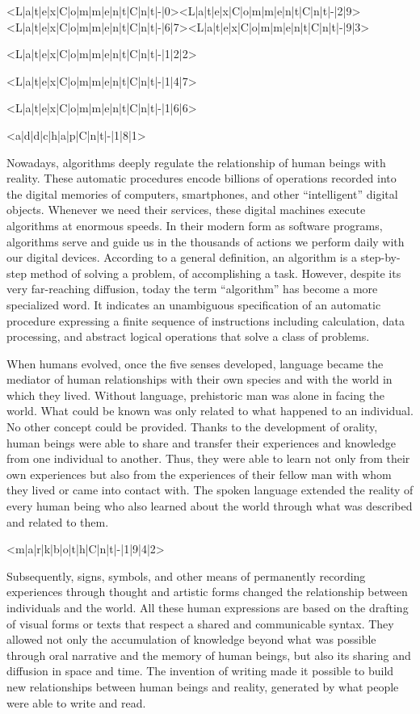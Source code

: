 <L|a|t|e|x|C|o|m|m|e|n|t|C|n|t|-|0><L|a|t|e|x|C|o|m|m|e|n|t|C|n|t|-|2|9><L|a|t|e|x|C|o|m|m|e|n|t|C|n|t|-|6|7><L|a|t|e|x|C|o|m|m|e|n|t|C|n|t|-|9|3>

<L|a|t|e|x|C|o|m|m|e|n|t|C|n|t|-|1|2|2>

<L|a|t|e|x|C|o|m|m|e|n|t|C|n|t|-|1|4|7>

<L|a|t|e|x|C|o|m|m|e|n|t|C|n|t|-|1|6|6>

<a|d|d|c|h|a|p|C|n|t|-|1|8|1>

Nowadays, algorithms deeply regulate the relationship of human beings with reality. These automatic procedures encode billions of operations recorded into the digital memories of computers, smartphones, and other ``intelligent'' digital objects. Whenever we need their services, these digital machines execute \hbox{algorithms} at enormous speeds. In their modern form as software programs, algorithms serve and guide us in the thousands of actions we perform daily with our digital devices. According to a general definition, an algorithm is a step-by-step method of solving a problem, of accomplishing a task. However, despite its very far-reaching diffusion, today the term ``algorithm'' has become a more specialized word. It indicates an unambiguous specification of an automatic procedure expressing a finite sequence of instructions including calculation, data processing, and abstract logical operations that solve a class of problems.

When humans evolved, once the five senses developed, language became the mediator of human relationships with their own species and with the world in which they lived. Without language, prehistoric man was alone in facing the world. What could be known was only related to what happened to an individual. No other concept could be provided. Thanks to the development of orality, human beings were able to share and transfer their experiences and knowledge from one individual to another. Thus, they were able to learn not only from their own experiences but also from the experiences of their fellow man with whom they lived or came into contact with. The spoken language extended the reality of every human being who also learned about the world through what was described and related to them.

<m|a|r|k|b|o|t|h|C|n|t|-|1|9|4|2>

Subsequently, signs, symbols, and other means of permanently recording experiences through thought and artistic forms changed the relationship between individuals and the world. All these human expressions are based on the drafting of visual forms or texts that respect a shared and communicable syntax. They allowed not only the accumulation of knowledge beyond what was possible through oral narrative and the memory of human beings, but also its sharing and diffusion in space and time. The invention of writing made it possible to build new relationships between human beings and reality, generated by what people were able to write and read.

